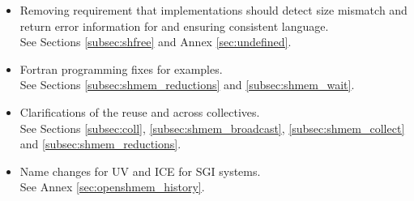 \begin{itemize}
\item Removing requirement that implementations should detect size mismatch and return error information for  and ensuring consistent language.\\See Sections \ref{subsec:shfree} and Annex \ref{sec:undefined}. 
\item Fortran programming fixes for examples.\\ See Sections \ref{subsec:shmem_reductions} and \ref{subsec:shmem_wait}. 
\item Clarifications of the reuse  and  across collectives.\\See Sections \ref{subsec:coll}, \ref{subsec:shmem_broadcast}, \ref{subsec:shmem_collect} and \ref{subsec:shmem_reductions}.
\item Name changes for UV and ICE for SGI systems.\\See Annex \ref{sec:openshmem_history}. 
\end{itemize}
